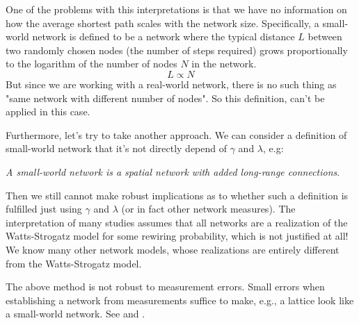 \nd One of the problems with this interpretations is that we have no information on how the average shortest path scales with the network size. Specifically, a small-world network is defined to be a network where the typical distance $L$ between two randomly chosen nodes (the number of steps required) grows proportionally to the logarithm of the number of nodes $N$ in the network.
$$ L \propto N $$
But since we are working with a real-world network, there is no such thing as "same network with different number of nodes". So this definition, can't be applied in this case. \s

\nd Furthermore, let's try to take another approach. We can consider a definition of small-world network that it's not directly depend of $\gamma$ and $\lambda$, e.g:

\begin{center}
    \emph{A small-world network is a spatial network with added long-range connections}.
\end{center}

\nd Then we still cannot make robust implications as to whether such a definition is fulfilled just using $\gamma$ and $\lambda$ (or in fact other network measures). The interpretation of many studies assumes that all networks are a realization of the Watts-Strogatz model for some rewiring probability, which is not justified at all! We know many other network models, whose realizations are entirely different from the Watts-Strogatz model. \s

\nd The above method is not robust to measurement errors. Small errors when establishing a network from measurements suffice to make, e.g., a lattice look like a small-world network. See \cite{https://doi.org/10.48550/arxiv.1111.4570} and \cite{10.3389/fnhum.2016.00096}. \s
